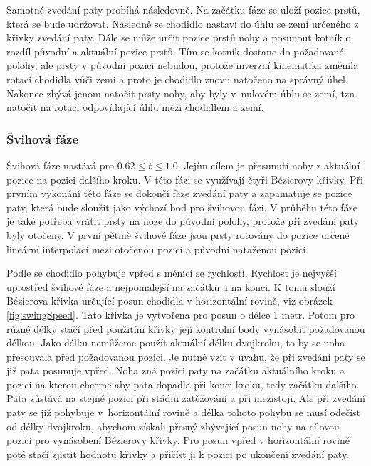 Samotné zvedání paty probíhá následovně. Na začátku fáze se uloží pozice prstů, která se bude udržovat. Následně se chodidlo nastaví do úhlu se zemí určeného z křivky zvedání paty. Dále se může určit pozice prstů nohy a posunout kotník o rozdíl původní a aktuální pozice prstů. Tím se kotník dostane do požadované polohy, ale prsty v původní pozici nebudou, protože inverzní kinematika změnila rotaci chodidla vůči zemi a proto je chodidlo znovu natočeno na správný úhel. Nakonec zbývá jenom natočit prsty nohy, aby byly v~nulovém úhlu se zemí, tzn. natočit na rotaci odpovídající úhlu mezi chodidlem a zemí.

\subsubsection{Švihová fáze}
Švihová fáze nastává pro $0.62 \leq t \leq 1.0$. Jejím cílem je přesunutí nohy z aktuální pozice na pozici dalšího kroku. V této fázi se využívají čtyři Bézierovy křivky. Při prvním vykonání této fáze se dokončí fáze zvedání paty a zapamatuje se pozice paty, která bude sloužit jako výchozí bod pro švihovou fázi. V průběhu této fáze je také potřeba vrátit prsty na noze do původní polohy, protože při zvedání paty byly otočeny. V první pětině švihové fáze jsou prsty rotovány do pozice určené lineární interpolací mezi otočenou pozicí a původní nataženou pozicí.

Podle \cite{chung} se chodidlo pohybuje vpřed s měnící se rychlostí.  Rychlost je nejvyšší uprostřed švihové fáze a nejpomalejší na začátku a na konci. K tomu slouží Bézierova křivka určující posun chodidla v horizontální rovině, viz obrázek \ref{fig:swingSpeed}. Tato křivka je vytvořena pro posun o délce 1 metr. Potom pro různé délky stačí před použitím křivky její kontrolní body vynásobit požadovanou délkou. Jako délku nemůžeme použít aktuální délku dvojkroku, to by se noha přesouvala před požadovanou pozici. Je nutné vzít v úvahu, že při zvedání paty se již  pata posunuje vpřed. Noha zná pozici paty na začátku aktuálního kroku a pozici na kterou chceme aby pata dopadla při konci kroku, tedy začátku dalšího. Pata zůstává na stejné pozici při stádiu zatěžování a při mezistoji. Ale při zvedání paty se již pohybuje v~horizontální rovině a délka tohoto pohybu se musí odečíst od délky dvojkroku, abychom získali přesný zbývající posun nohy na cílovou pozici pro vynásobení Bézierovy křivky. Pro posun vpřed v horizontální rovině poté stačí zjistit hodnotu křivky a přičíst ji k pozici po ukončení zvedání paty.

